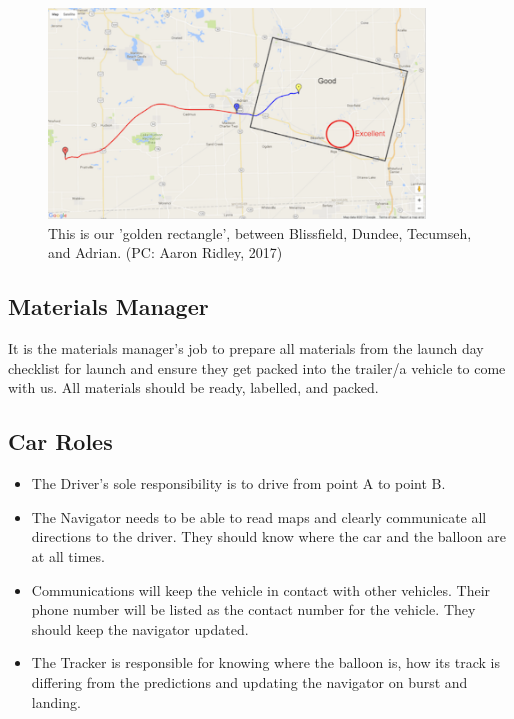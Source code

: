 \documentclass[12pt]{article}
\begin{document}
	\begin{figure}[h!]
		\begin{center}
			\includegraphics[width = 100mm]{Figures/LandingLocation.png}
			\caption{This is our 'golden rectangle', between Blissfield, Dundee, Tecumseh, and Adrian. (PC: Aaron Ridley, 2017)}
		\end{center}
	\end{figure}
	
	\subsection*{Materials Manager}
	It is the materials manager's job to prepare all materials from the launch day checklist for launch and ensure they get packed into the trailer/a vehicle to come with us. All materials should be ready, labelled, and packed. 
	
	\subsection*{Car Roles}
	\begin{itemize}
	    \item The Driver's sole responsibility is to drive from point A to point B.
	    
	    \item The Navigator needs to be able to read maps and clearly communicate all directions to the driver. They should know where the car and the balloon are at all times.
	    
	    \item Communications will keep the vehicle in contact with other vehicles. Their phone number will be listed as the contact number for the vehicle. They should keep the navigator updated.
	    
	    \item The Tracker is responsible for knowing where the balloon is, how its track is differing from the predictions and updating the navigator on burst and landing.
	\end{itemize}
	
\end{document}
